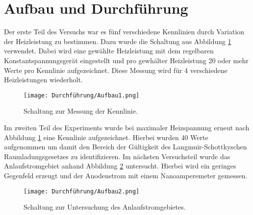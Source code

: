 \section{Aufbau und Durchführung}
Der erste Teil des Versuchs war es fünf verschiedene Kennlinien durch Variation der Heizleistung zu bestimmen.
Dazu wurde die Schaltung aus Abbildung \ref{fig:aufbau1} verwendet.
Dabei wird eine gewählte Heizleistung mit dem regelbaren Konstantspannungsgerät eingestellt und pro gewhälter Heizleistung 20 oder mehr Werte pro Kennlinie aufgezeichnet.
Diese Messung wird für 4 verschiedene Heizleistungen wiederholt.

\begin{figure}[h]
    \centering
    \texttt{[image: Durchführung/Aufbau1.png]}
    \caption{Schaltung zur Messung der Kennlinie.}
    \label{fig:aufbau1}
\end{figure}

Im zweiten Teil des Experiments wurde bei maximaler Heizspannung erneut nach Abbildung \ref{fig:aufbau1} eine Kennlinie aufgezeichnet.
Hierbei wurden 40 Werte aufgenommen um damit den Bereich der Gültigkeit des Langmuir-Schottkyschen Raumladungsgesetzes zu identifizieren.
Im nächsten Versuchsteil wurde das Anlaufstromgebiet anhand Abbildung \ref{fig:aufbau2} untersucht.
Hierbei wird ein geringes Gegenfeld erzeugt und der Anodenstrom mit einem Nanoamperemeter gemessen.

\begin{figure}[h]
    \centering
    \texttt{[image: Durchführung/Aufbau2.png]}
    \caption{Schaltung zur Untersuchung des Anlaufstromgebietes.}
    \label{fig:aufbau2}
\end{figure}